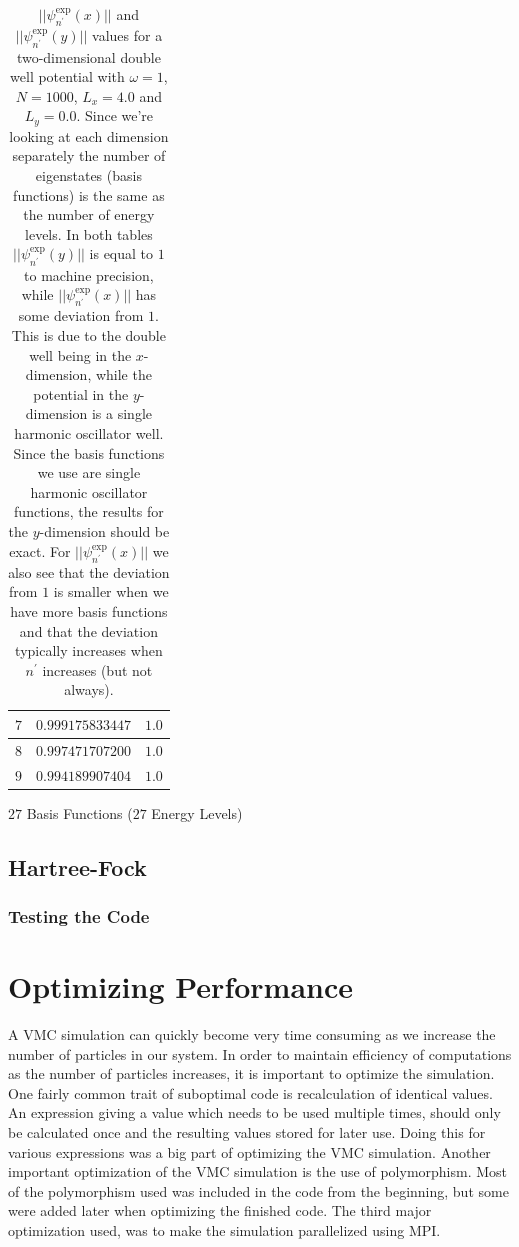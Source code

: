 \documentclass[../main.tex]{subfiles}
\begin{document}
\begin{table}[!ht]
\begin{subtable}{.4\linewidth}
\begin{tabular}{ | c | c | c | }
        $7$ & $0.999175833447$ & $1.0$\\*
        \hline
        $8$ & $0.997471707200$ & $1.0$\\*
        \hline
        $9$ & $0.994189907404$ & $1.0$\\*
        \hline
    \end{tabular}
    \caption{$27$ Basis Functions ($27$ Energy Levels)}
    \label{tab:NormE20b}
  \end{subtable}
  \caption{$||\psi_{n^\prime}^\textrm{exp}(x)||$ and $||\psi_{n^\prime}^\textrm{exp}(y)||$ values for a two-dimensional double well potential with $\omega = 1$, $N = 1000$, $L_x = 4.0$ and $L_y = 0.0$. Since we're looking at each dimension separately the number of eigenstates (basis functions) is the same as the number of energy levels. In both tables $||\psi_{n^\prime}^\textrm{exp}(y)||$ is equal to $1$ to machine precision, while $||\psi_{n^\prime}^\textrm{exp}(x)||$ has some deviation from $1$. This is due to the double well being in the $x$-dimension, while the potential in the $y$-dimension is a single harmonic oscillator well. Since the basis functions we use are single harmonic oscillator functions, the results for the $y$-dimension should be exact. For $||\psi_{n^\prime}^\textrm{exp}(x)||$ we also see that the deviation from $1$ is smaller when we have more basis functions and that the deviation typically increases when $n^\prime$ increases (but not always).}
  \label{tab:NormE20}
\end{table}

\subsection{Hartree-Fock}

\subsubsection{Testing the Code}


\section{Optimizing Performance}

A VMC simulation can quickly become very time consuming as we increase the number of particles in our system. In order to maintain efficiency of computations as the number of particles increases, it is important to optimize the simulation. One fairly common trait of suboptimal code is recalculation of identical values. An expression giving a value which needs to be used multiple times, should only be calculated once and the resulting values stored for later use. Doing this for various expressions was a big part of optimizing the VMC simulation. Another important optimization of the VMC simulation is the use of polymorphism. Most of the polymorphism used was included in the code from the beginning, but some were added later when optimizing the finished code. The third major optimization used, was to make the simulation parallelized using MPI.
\end{document}
